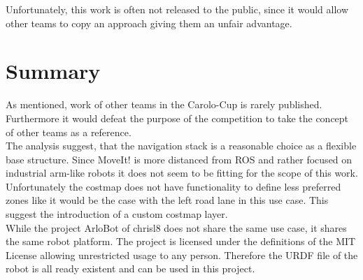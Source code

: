 Unfortunately, this work is often not released to the public, since it would allow other teams to copy an approach giving them an unfair advantage.\\

\section{Summary}
As mentioned, work of other teams in the Carolo-Cup is rarely published. Furthermore it would defeat the purpose of the competition to take the concept of other teams as a reference.\\

The analysis suggest, that the navigation stack is a reasonable choice as a flexible base structure. Since MoveIt! is more distanced from ROS and rather focused on industrial arm-like robots it does not seem to be fitting for the scope of this work.\\

Unfortunately the costmap does not have functionality to define less preferred zones like it would be the case with the left road lane in this use case. This suggest the introduction of a custom costmap layer.\\


While the project ArloBot of chrisl8 does not share the same use case, it shares the same robot platform. The project is licensed under the definitions of the MIT License allowing unrestricted usage to any person. Therefore the URDF file of the robot is all ready existent and can be used in this project.









